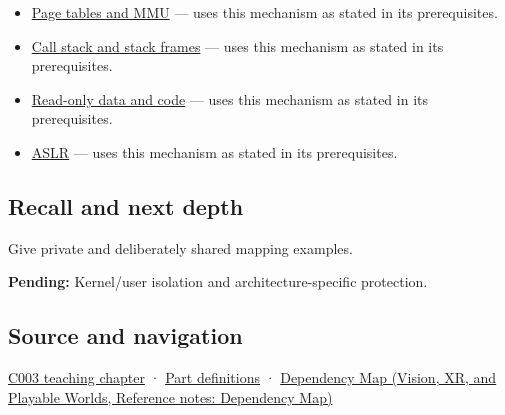 \hypertarget{appendix-c2a9ad1e2b49-used-by}{}

\begin{itemize}
\tightlist
\item
  \hyperref[appendix-01e5905165c4]{Page tables and MMU} --- uses this mechanism as stated in its prerequisites.
\item
  \hyperref[appendix-b081b7abe193]{Call stack and stack frames} --- uses this mechanism as stated in its prerequisites.
\item
  \hyperref[appendix-5f9e5e2f0a5e]{Read-only data and code} --- uses this mechanism as stated in its prerequisites.
\item
  \hyperref[appendix-78cb248c8355]{ASLR} --- uses this mechanism as stated in its prerequisites.
\end{itemize}

\subsection{Recall and next depth}\label{appendix-c2a9ad1e2b49-recall-and-next-depth}

\hypertarget{appendix-c2a9ad1e2b49-recall-and-next-depth}{}

Give private and deliberately shared mapping examples.

\textbf{Pending:} Kernel/user isolation and architecture-specific protection.

\subsection{Source and navigation}\label{appendix-c2a9ad1e2b49-source-and-navigation}

\hypertarget{appendix-c2a9ad1e2b49-source-and-navigation}{}

\hyperref[01-foundations-i-ch002-where-the-bytes-live]{C003 teaching chapter} · \hyperref[appendix-fd090d982a15-m003---parts-41-60]{Part definitions} · \href{../07-Vision-XR-and-Playable-Worlds/main.pdf\#nameddest=appendix-4ad47bdd269a}{Dependency Map (Vision, XR, and Playable Worlds, Reference notes: Dependency Map)}
